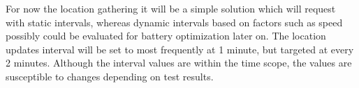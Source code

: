 For now the location gathering it will be a simple solution which will request with static intervals, whereas dynamic intervals based on factors such as speed possibly could be evaluated for battery optimization later on.
The location updates interval will be set to most frequently at 1 minute, but targeted at every 2 minutes.
Although the interval values are within the time scope, the values are susceptible to changes depending on test results.